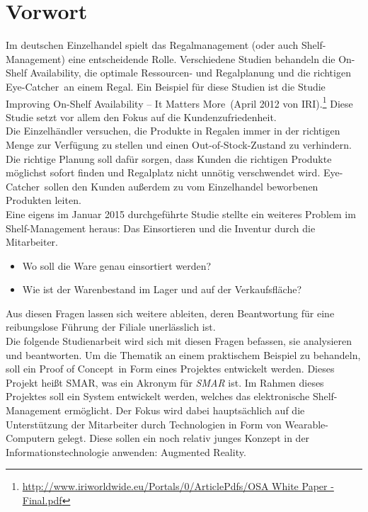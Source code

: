 \chapter{Vorwort}
\label{cha:vorwort}
Im deutschen Einzelhandel spielt das Regalmanagement (oder auch Shelf-Management) eine entscheidende Rolle. Verschiedene Studien behandeln die \glqq On-Shelf Availability\grqq , die optimale Ressourcen- und Regalplanung und die richtigen \glqq Eye-Catcher\grqq~an einem Regal. Ein Beispiel für diese Studien ist \zB die Studie \glqq Improving On-Shelf Availability -- It Matters More\grqq~(April 2012 von IRI).\footnote{\url{http://www.iriworldwide.eu/Portals/0/ArticlePdfs/OSA White Paper - Final.pdf}} Diese Studie setzt vor allem den Fokus auf die Kundenzufriedenheit.\\

Die Einzelhändler versuchen, die Produkte in Regalen immer in der richtigen Menge zur Verfügung zu stellen und einen \glqq Out-of-Stock\grqq -Zustand zu verhindern. Die richtige Planung soll dafür sorgen, dass Kunden die richtigen Produkte möglichst sofort finden und Regalplatz nicht unnötig verschwendet wird. \glqq Eye-Catcher\grqq~sollen den Kunden außerdem zu vom Einzelhandel beworbenen Produkten leiten.\\

Eine eigens im Januar 2015 durchgeführte Studie stellte ein weiteres Problem im Shelf-Management heraus: Das Einsortieren und die Inventur durch die Mitarbeiter.
\begin{itemize}
	\item Wo soll die Ware genau einsortiert werden?
	\item Wie ist der Warenbestand im Lager und auf der Verkaufsfläche?
\end{itemize}
Aus diesen Fragen lassen sich weitere ableiten, deren Beantwortung für eine reibungslose Führung der Filiale unerlässlich ist.\\

Die folgende Studienarbeit wird sich mit diesen Fragen befassen, sie analysieren und beantworten. Um die Thematik an einem praktischem Beispiel zu behandeln, soll ein \glqq Proof of Concept\grqq~in Form eines Projektes entwickelt werden. Dieses Projekt heißt \acs{SMAR}, was ein Akronym für \emph{\acl{SMAR}} ist. Im Rahmen dieses Projektes soll ein System entwickelt werden, welches das elektronische Shelf-Management ermöglicht. Der Fokus wird dabei hauptsächlich auf die Unterstützung der Mitarbeiter durch Technologien in Form von Wearable-Computern gelegt. Diese sollen ein noch relativ junges Konzept in der Informationstechnologie anwenden: Augmented Reality.

